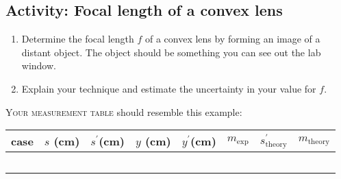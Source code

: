 \subsection{Activity: Focal length of a convex lens}
\begin{enumerate}
	\item Determine the focal length $f$ of a convex lens by forming an image of a distant object.  The object should be something you can see out the lab window.\label{s:focal}
	\item Explain your technique and estimate the uncertainty in your value for $f$.
\end{enumerate}
\begin{marginfigure}
	\textsc{Your measurement table} should resemble this example:\\[1ex]
	
	\begin{sideways}
	\begin{tabular}{l|l|l|l|l|l|l|l}
		case&$s$ (cm)&$s^{\prime}$(cm)&$y$ (cm)&$y^{\prime}$(cm)&$m_{\textrm{exp}}$&$s^{\prime}_{\textrm{theory}}$&$m_{\textrm{theory}}$\\
		\midrule\addlinespace[-2.25pt]
		\phantom{x} & \phantom{x}& \phantom{x}& \phantom{x}& \phantom{x}& \phantom{x}& \phantom{x}\\
		\midrule[0.1pt]\addlinespace[-2pt]
		\phantom{x} & \phantom{x}& \phantom{x}& \phantom{x}& \phantom{x}& \phantom{x}& \phantom{x}\\
		\midrule[0.1pt]\addlinespace[-2pt]
		\phantom{x} & \phantom{x}& \phantom{x}& \phantom{x}& \phantom{x}& \phantom{x}& \phantom{x}\\
		\midrule[0.1pt]\addlinespace[-2pt]
		\phantom{x} & \phantom{x}& \phantom{x}& \phantom{x}& \phantom{x}& \phantom{x}& \phantom{x}\\
		\midrule[0.1pt]\addlinespace[-2pt]
		\phantom{x} & \phantom{x}& \phantom{x}& \phantom{x}& \phantom{x}& \phantom{x}& \phantom{x}
	\end{tabular}
	\end{sideways}
		\hspace{6ex}
\end{marginfigure}

